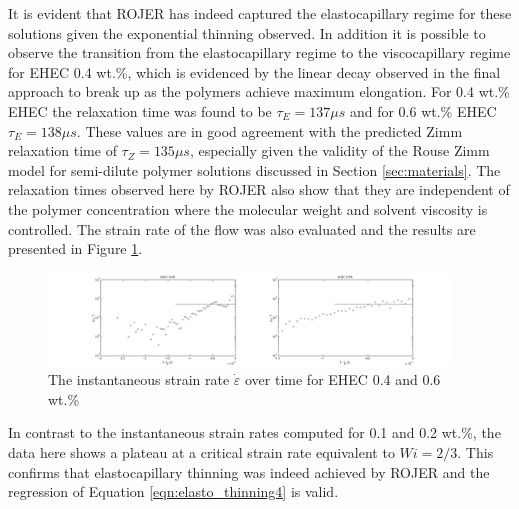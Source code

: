 \documentclass[11pt]{article}
\begin{document}
It is evident that ROJER has indeed captured the elastocapillary regime for 
these solutions given the exponential thinning observed. In addition it is 
possible to observe the transition from the elastocapillary regime to the 
viscocapillary regime for EHEC 0.4 wt.\%, which is evidenced by the linear 
decay observed in the final approach to break up as the polymers achieve 
maximum elongation. For 0.4 wt.\% EHEC the relaxation time was found to be 
$\tau_E = 137 \mu s$ and for 0.6 wt.\% EHEC $\tau_E = 138 \mu s$. These values 
are in good agreement with the predicted Zimm relaxation time of $\tau_{Z} = 
135 \mu s$, especially given the validity of the Rouse Zimm model for 
semi-dilute polymer solutions discussed in Section \ref{sec:materials}. The 
relaxation times observed here by ROJER also show that they are independent of 
the polymer concentration where the molecular weight and solvent viscosity is 
controlled. The strain rate of the flow was also evaluated and the results 
are presented in Figure \ref{fig:4_6_EHEC_strain}.
\begin{figure}[H]
	\begin{center}
		\includegraphics[width=0.95\textwidth, trim = 7cm 0cm 6cm 0cm]{img/4_6_EHEC_strain.png}
		\caption{The instantaneous strain rate $\dot{\varepsilon}$ over time 
for EHEC 0.4 and 0.6 wt.\%}
		\label{fig:4_6_EHEC_strain}
	\end{center}
\end{figure}

In contrast to the instantaneous strain rates computed for 0.1 and 0.2 wt.\%, 
the data here shows a plateau at a critical strain rate equivalent to $Wi = 
2/3$. This confirms that elastocapillary thinning was indeed achieved by ROJER 
and the regression of Equation \ref{eqn:elasto_thinning4} is valid.
\end{document}
